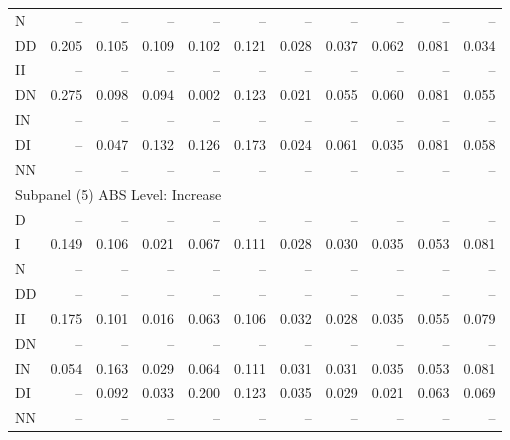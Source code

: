 {\begin{tabular}{lrrrrrrrrrr}
N      &    -- &    -- &    -- &    -- &     -- &     -- &     -- &     -- &     -- &     -- \\
DD     & 0.205 & 0.105 & 0.109 & 0.102 &  0.121 &  0.028 &  0.037 &  0.062 &  0.081 &  0.034 \\
II     &    -- &    -- &    -- &    -- &     -- &     -- &     -- &     -- &     -- &     -- \\
DN     & 0.275 & 0.098 & 0.094 & 0.002 &  0.123 &  0.021 &  0.055 &  0.060 &  0.081 &  0.055 \\
IN     &    -- &    -- &    -- &    -- &     -- &     -- &     -- &     -- &     -- &     -- \\
DI     &    -- & 0.047 & 0.132 & 0.126 &  0.173 &  0.024 &  0.061 &  0.035 &  0.081 &  0.058 \\
NN     &    -- &    -- &    -- &    -- &     -- &     -- &     -- &     -- &     -- &     -- \\ \hline
\multicolumn{11}{l}{Subpanel (5) ABS Level: Increase}                                        \\ \hline
D      &    -- &    -- &    -- &    -- &     -- &     -- &     -- &     -- &     -- &     -- \\
I      & 0.149 & 0.106 & 0.021 & 0.067 &  0.111 &  0.028 &  0.030 &  0.035 &  0.053 &  0.081 \\
N      &    -- &    -- &    -- &    -- &     -- &     -- &     -- &     -- &     -- &     -- \\
DD     &    -- &    -- &    -- &    -- &     -- &     -- &     -- &     -- &     -- &     -- \\
II     & 0.175 & 0.101 & 0.016 & 0.063 &  0.106 &  0.032 &  0.028 &  0.035 &  0.055 &  0.079 \\
DN     &    -- &    -- &    -- &    -- &     -- &     -- &     -- &     -- &     -- &     -- \\
IN     & 0.054 & 0.163 & 0.029 & 0.064 &  0.111 &  0.031 &  0.031 &  0.035 &  0.053 &  0.081 \\
DI     &    -- & 0.092 & 0.033 & 0.200 &  0.123 &  0.035 &  0.029 &  0.021 &  0.063 &  0.069 \\
NN     &    -- &    -- &    -- &    -- &     -- &     -- &     -- &     -- &     -- &     -- \\ \hline\hline
\end{tabular}}

